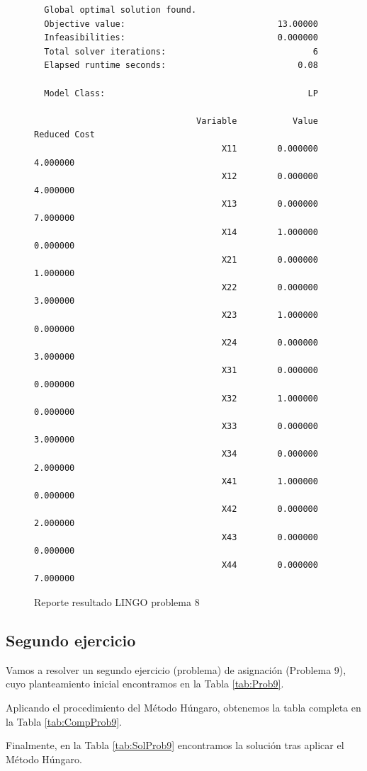 \documentclass[12pt]{article}  %
\begin{document}
\begin{figure}[H]
	\centering
	\caption{Reporte resultado LINGO problema 8}
	\label{fig:reporteProb8}
	\begin{verbatim}
  Global optimal solution found.
  Objective value:                              13.00000
  Infeasibilities:                              0.000000
  Total solver iterations:                             6
  Elapsed runtime seconds:                          0.08

  Model Class:                                        LP
  
                                Variable           Value        Reduced Cost
                                     X11        0.000000            4.000000
                                     X12        0.000000            4.000000
                                     X13        0.000000            7.000000
                                     X14        1.000000            0.000000
                                     X21        0.000000            1.000000
                                     X22        0.000000            3.000000
                                     X23        1.000000            0.000000
                                     X24        0.000000            3.000000
                                     X31        0.000000            0.000000
                                     X32        1.000000            0.000000
                                     X33        0.000000            3.000000
                                     X34        0.000000            2.000000
                                     X41        1.000000            0.000000
                                     X42        0.000000            2.000000
                                     X43        0.000000            0.000000
                                     X44        0.000000            7.000000
	\end{verbatim}
\end{figure}

\subsection{Segundo ejercicio}
Vamos a resolver un segundo ejercicio (problema) de asignación (Problema 9), cuyo planteamiento inicial encontramos en la Tabla \ref{tab:Prob9}.

Aplicando el procedimiento del Método Húngaro, obtenemos la tabla completa en la Tabla \ref{tab:CompProb9}.

Finalmente, en la Tabla \ref{tab:SolProb9} encontramos la solución tras aplicar el Método Húngaro.
\end{document}

